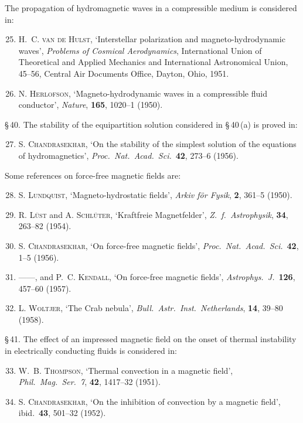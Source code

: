 The propagation of hydromagnetic waves in a compressible medium is considered in:
\begin{enumerate}
\setcounter{enumi}{24}
\item H.~C. \textsc{van de Hulst}, `Interstellar polarization and magneto-hydrodynamic waves', \emph{Problems of Cosmical Aerodynamics}, International Union of Theoretical and Applied Mechanics and International Astronomical Union, 45--56, Central Air Documents Office, Dayton, Ohio, 1951.
\item N. \textsc{Herlofson}, `Magneto-hydrodynamic waves in a compressible fluid conductor', \emph{Nature}, \textbf{165}, 1020--1 (1950).
\end{enumerate}

\S\,40. The stability of the equipartition solution considered in \S\,40\,(a) is proved in:
\begin{enumerate}
\setcounter{enumi}{26}
\item S. \textsc{Chandrasekhar}, `On the stability of the simplest solution of the equations of hydromagnetics', \emph{Proc.\ Nat.\ Acad.\ Sci.}\ \textbf{42}, 273--6 (1956).
\end{enumerate}

Some references on force-free magnetic fields are:
\begin{enumerate}
\setcounter{enumi}{27}
\item S. \textsc{Lundquist}, `Magneto-hydrostatic fields', \emph{Arkiv f\"or Fysik}, \textbf{2}, 361--5 (1950).
\item R. \textsc{L\"ust} and A. \textsc{Schl\"uter}, `Kraftfreie Magnetfelder', \emph{Z.\ f.\ Astrophysik}, \textbf{34}, 263--82 (1954).
\item S. \textsc{Chandrasekhar}, `On force-free magnetic fields', \emph{Proc.\ Nat.\ Acad.\ Sci.}\ \textbf{42}, 1--5 (1956).
\item ------, and P.~C. \textsc{Kendall}, `On force-free magnetic fields', \emph{Astrophys.\ J.}\ \textbf{126}, 457--60 (1957).
\item L. \textsc{Woltjer}, `The Crab nebula', \emph{Bull.\ Astr.\ Inst.\ Netherlands}, \textbf{14}, 39--80 (1958).
\end{enumerate}

\S\,41. The effect of an impressed magnetic field on the onset of thermal instability in electrically conducting fluids is considered in:
\begin{enumerate}
\setcounter{enumi}{32}
\item W.~B. \textsc{Thompson}, `Thermal convection in a magnetic field', \emph{Phil.\ Mag.\ Ser.\ 7}, \textbf{42}, 1417--32 (1951).
\item S. \textsc{Chandrasekhar}, `On the inhibition of convection by a magnetic field', ibid.\ \textbf{43}, 501--32 (1952).
\end{enumerate}

